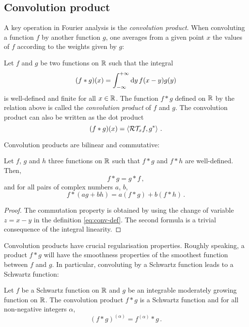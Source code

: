 \subsection{Convolution product}
A key operation in Fourier analysis is the \emph{convolution product}. When convoluting a
function $f$ by another function $g$, one averages from a given point $x$ the values of $f$
according to the weights given by $g$:
\begin{definition}
  Let $f$ and $g$ be two functions on $\mathbb{R}$ such that the integral
  \begin{equation}
    (f\ast g)(x)=\int_{-\infty}^{+\infty}\mathrm{d}{y}\,f(x-y)g(y)\label{eq:conv-def}
  \end{equation}
  is well-defined and finite for all $x\in\mathbb{R}$. The function $f\ast g$ defined on $\mathbb{R}$ by
  the relation above is called the \emph{convolution product} of $f$ and $g$.
  The convolution product can also be written as the dot product
  \begin{equation}
    (f\ast g)(x)=\braket{\mathcal{R}\mathcal{T}_xf,g^*}\,.
  \end{equation}
\end{definition}
Convolution products are bilinear and commutative:
\begin{proposition}
  Let $f$, $g$ and $h$ three functions on $\mathbb{R}$ such that $f\ast g$ and $f\ast h$ are
  well-defined. Then,
  \begin{equation}
    f\ast g=g\ast f\,,
  \end{equation}
  and for all pairs of complex numbers $a$, $b$,
  \begin{equation}
    f\ast (ag+bh)=a(f\ast g) + b(f\ast h)\,.
  \end{equation}
\end{proposition}
\begin{proof}
  The commutation property is obtained by using the change of variable
  $z=x-y$ in the definition \cref{eq:conv-def}. The second formula is a trivial consequence
  of the integral linearity.
\end{proof}
Convolution products have crucial regularisation properties. Roughly speaking, a product
$f\ast g$ will have the smoothness properties of the smoothest function between $f$
and $g$. In particular, convoluting by a Schwartz function leads to a Schwartz function:
\begin{theorem}
  Let $f$ be a Schwartz function on $\mathbb{R}$ and $g$ be an integrable moderately growing
  function on $\mathbb{R}$. The convolution product $f\ast g$ is a Schwartz function and for all
  non-negative integers $\alpha$,
  \begin{equation}
    (f\ast g)^{(\alpha)}=f^{(\alpha)}\ast g\,.
  \end{equation}
\end{theorem}

